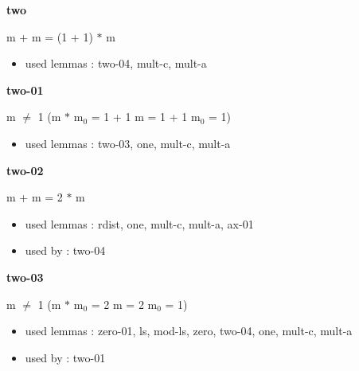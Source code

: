 \documentclass[a4paper]{article}
\begin{document}
\medskip

\bigskip

{\large\bf two}

\medskip

 \Fol m + m = (1 + 1) $*$ m

\begin{itemize}


\item       used lemmas  : two-04, mult-c, mult-a

\end{itemize}

\medskip

\bigskip

{\large\bf two-01}

\medskip

 \Fol m $\neq$ 1 \Imp (m $*$ $\mbox{m}_{0}$ = 1 + 1 \Equiv m = 1 + 1 \And $\mbox{m}_{0}$ = 1)

\begin{itemize}


\item       used lemmas  : two-03, one, mult-c, mult-a

\end{itemize}

\medskip

\bigskip

{\large\bf two-02}

\medskip

 \Fol m + m = 2 $*$ m

\begin{itemize}


\item       used lemmas  : rdist, one, mult-c, mult-a, ax-01
\item       used by      : two-04

\end{itemize}

\medskip

\bigskip

{\large\bf two-03}

\medskip

 \Fol m $\neq$ 1 \Imp (m $*$ $\mbox{m}_{0}$ = 2 \Equiv m = 2 \And $\mbox{m}_{0}$ = 1)

\begin{itemize}


\item       used lemmas  : zero-01, ls, mod-ls, zero, two-04, one, mult-c, mult-a
\item       used by      : two-01

\end{itemize}
\end{document}
